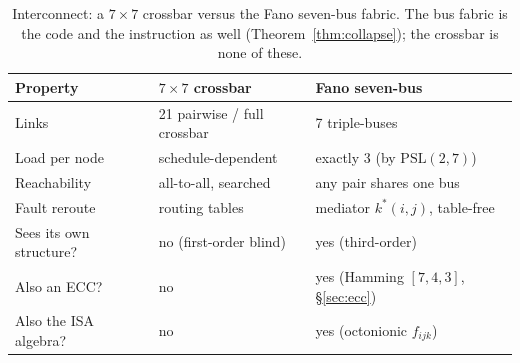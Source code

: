 \begin{table}[H]
\centering\small
\caption{Interconnect: a $7\times7$ crossbar versus the Fano seven-bus
fabric. The bus fabric is the code and the instruction as well
(Theorem~\ref{thm:collapse}); the crossbar is none of these.}
\label{tab:crossbar-vs-fano}
\begin{tabular}{@{}p{3.6cm}p{3.6cm}p{4.5cm}@{}}
\toprule
\textbf{Property} & \textbf{$7\times7$ crossbar} & \textbf{Fano seven-bus} \\
\midrule
Links & 21 pairwise / full crossbar & 7 triple-buses \\
Load per node & schedule-dependent & exactly 3 (by $\mathrm{PSL}(2,7)$) \\
Reachability & all-to-all, searched & any pair shares one bus \\
Fault reroute & routing tables & mediator $k^\ast(i,j)$, table-free \\
Sees its own structure? & no (first-order blind) & yes (third-order) \\
Also an ECC? & no & yes (Hamming $[7,4,3]$, \S\ref{sec:ecc}) \\
Also the ISA algebra? & no & yes (octonionic $f_{ijk}$) \\
\bottomrule
\end{tabular}
\end{table}
